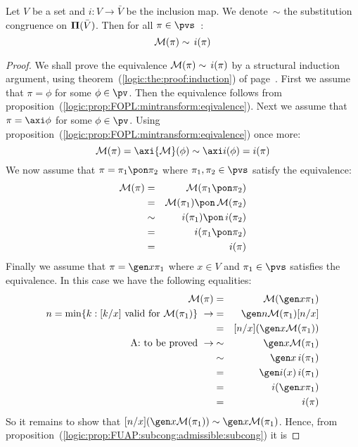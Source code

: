 \begin{prop}\label{logic:prop:FUAP:mintransfsubcong:equivalence}
Let $V$ be a set and $i:V\to\bar{V}$ be the inclusion map. We
denote~$\sim$ the substitution congruence on ${\bf\Pi}(\bar{V})$.
Then for all $\pi\in\pvs$ \,:
    \[
    {\cal M}(\pi)\sim\, i(\pi)
    \]
\end{prop}
\begin{proof}
We shall prove the equivalence ${\cal M}(\pi)\sim\, i(\pi)$ by a
structural induction argument, using
theorem~(\ref{logic:the:proof:induction}) of
page~\pageref{logic:the:proof:induction}. First we assume that
$\pi=\phi$ for some $\phi\in\pv$. Then the equivalence follows from
proposition~(\ref{logic:prop:FOPL:mintransform:eqivalence}). Next we
assume that $\pi=\axi\phi$ for some $\phi\in\pv$. Using
proposition~(\ref{logic:prop:FOPL:mintransform:eqivalence}) once
more:
    \[
    {\cal M}(\pi)=\axi{\cal M}(\phi)\sim\axi i(\phi)=i(\pi)
    \]
We now assume that $\pi=\pi_{1}\pon\pi_{2}$ where
$\pi_{1},\pi_{2}\in\pvs$ satisfy the equivalence:
    \begin{eqnarray*}
    {\cal M}(\pi)&=&{\cal M}(\pi_{1}\pon\pi_{2})\\
    &=&{\cal M}(\pi_{1})\pon\,{\cal M}(\pi_{2})\\
    &\sim&i(\pi_{1})\pon\,i(\pi_{2})\\
    &=&i(\pi_{1}\pon\pi_{2})\\
    &=&i(\pi)
    \end{eqnarray*}
Finally we assume that $\pi=\gen x\pi_{1}$ where $x\in V$ and
$\pi_{1}\in\pvs$ satisfies the equivalence. In this case we have the
following equalities:
    \begin{eqnarray*}
    {\cal M}(\pi)&=&{\cal M}(\gen x\pi_{1})\\
    n=\min\{k:[k/x]\mbox{ valid for }{\cal M}(\pi_{1})\}\
    \rightarrow
    &=&\gen n{\cal M}(\pi_{1})[n/x]\\
    &=&[n/x](\gen x{\cal M}(\pi_{1}))\\
    \mbox{A: to be proved}\ \rightarrow
    &\sim&\gen x{\cal M}(\pi_{1})\\
    &\sim&\gen x\, i(\pi_{1})\\
    &=&\gen i(x)\, i(\pi_{1})\\
    &=&i(\gen x\pi_{1})\\
    &=&i(\pi)
    \end{eqnarray*}
So it remains to show that $[n/x](\gen x{\cal M}(\pi_{1}))\sim\gen
x{\cal M}(\pi_{1})$. Hence, from
proposition~(\ref{logic:prop:FUAP:subcong:admissible:subcong}) it is

\end{proof}

